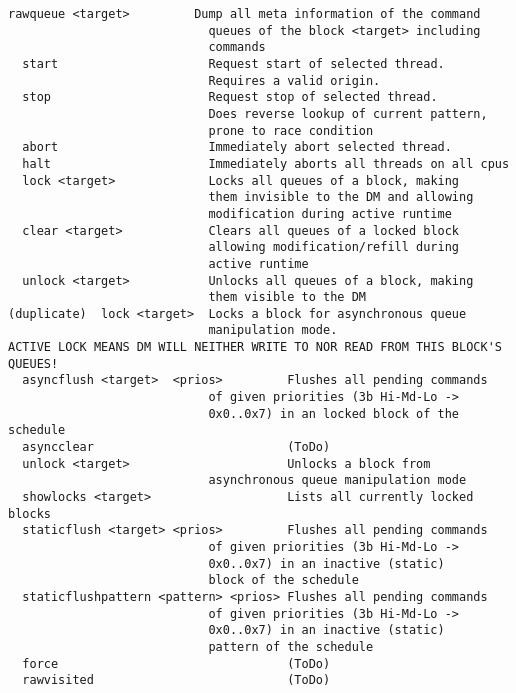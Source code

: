 \begin{lstlisting}[style = helptext]
  rawqueue <target>         Dump all meta information of the command 
                            queues of the block <target> including 
                            commands
  start                     Request start of selected thread. 
                            Requires a valid origin.
  stop                      Request stop of selected thread. 
                            Does reverse lookup of current pattern, 
                            prone to race condition
  abort                     Immediately abort selected thread.
  halt                      Immediately aborts all threads on all cpus
  lock <target>             Locks all queues of a block, making 
                            them invisible to the DM and allowing 
                            modification during active runtime
  clear <target>            Clears all queues of a locked block 
                            allowing modification/refill during 
                            active runtime
  unlock <target>           Unlocks all queues of a block, making 
                            them visible to the DM
(duplicate)  lock <target>  Locks a block for asynchronous queue 
                            manipulation mode.
ACTIVE LOCK MEANS DM WILL NEITHER WRITE TO NOR READ FROM THIS BLOCK'S QUEUES!
  asyncflush <target>  <prios>         Flushes all pending commands 
                            of given priorities (3b Hi-Md-Lo -> 
                            0x0..0x7) in an locked block of the schedule
  asyncclear                           (ToDo)
  unlock <target>                      Unlocks a block from 
                            asynchronous queue manipulation mode
  showlocks <target>                   Lists all currently locked blocks
  staticflush <target> <prios>         Flushes all pending commands 
                            of given priorities (3b Hi-Md-Lo -> 
                            0x0..0x7) in an inactive (static) 
                            block of the schedule
  staticflushpattern <pattern> <prios> Flushes all pending commands 
                            of given priorities (3b Hi-Md-Lo -> 
                            0x0..0x7) in an inactive (static) 
                            pattern of the schedule
  force                                (ToDo)
  rawvisited                           (ToDo)


\end{lstlisting}

